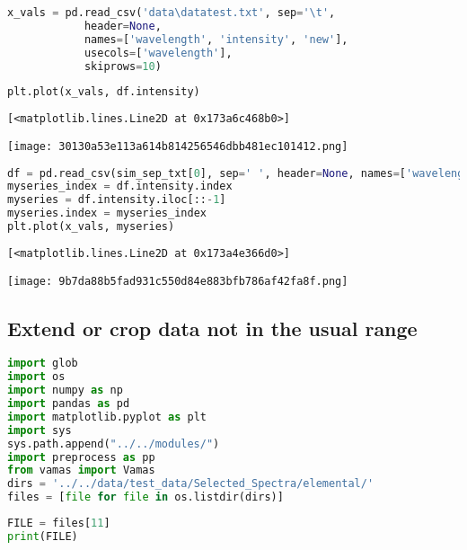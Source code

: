 \begin{lstlisting}[language=Python]
x_vals = pd.read_csv('data\datatest.txt', sep='\t', 
            header=None, 
            names=['wavelength', 'intensity', 'new'],
            usecols=['wavelength'],
            skiprows=10)
\end{lstlisting}

\begin{lstlisting}[language=Python]
plt.plot(x_vals, df.intensity)
\end{lstlisting}

\begin{lstlisting}
[<matplotlib.lines.Line2D at 0x173a6c468b0>]
\end{lstlisting}

\texttt{[image: 30130a53e113a614b814256546dbb481ec101412.png]}

\begin{lstlisting}[language=Python]
df = pd.read_csv(sim_sep_txt[0], sep=' ', header=None, names=['wavelength', 'intensity', ''])
myseries_index = df.intensity.index
myseries = df.intensity.iloc[::-1]
myseries.index = myseries_index
plt.plot(x_vals, myseries)
\end{lstlisting}

\begin{lstlisting}
[<matplotlib.lines.Line2D at 0x173a4e366d0>]
\end{lstlisting}

\texttt{[image: 9b7da88b5fad931c550d84e883bfb786af42fa8f.png]}

\hypertarget{extend-or-crop-data-not-in-the-usual-range}{%
\subsection*{Extend or crop data not in the usual
range}\label{extend-or-crop-data-not-in-the-usual-range}}

\begin{lstlisting}[language=Python]
import glob
import os
import numpy as np
import pandas as pd
import matplotlib.pyplot as plt
import sys
sys.path.append("../../modules/")
import preprocess as pp
from vamas import Vamas
dirs = '../../data/test_data/Selected_Spectra/elemental/'
files = [file for file in os.listdir(dirs)]
\end{lstlisting}

\begin{lstlisting}[language=Python]
FILE = files[11]
print(FILE)
\end{lstlisting}

